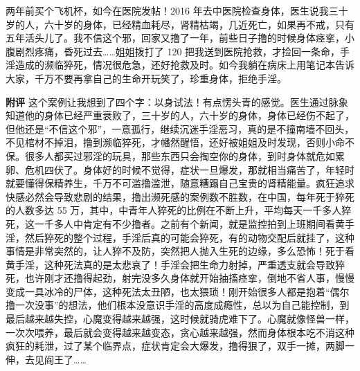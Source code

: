 \begin{case}
    两年前买个飞机杯，如今在医院发帖！2016 年去中医院检查身体，医生说我三十岁的人，六十岁的身体，已经精血耗尽，肾精枯竭，几近死亡，如果再不戒，只有五年活头儿了。我不信这个邪，回家又撸了一年，前些日子撸的时候身体痉挛，小腹剧烈疼痛，昏死过去……姐姐拨打了 120 把我送到医院抢救，才捡回一条命，手淫造成的濒临猝死，情况很危急，还好抢救及时。如今我躺在病床上用笔记本告诉大家，千万不要再拿自己的生命开玩笑了，珍重身体，拒绝手淫。

    \textbf{附评} 这个案例让我想到了四个字：以身试法！有点愣头青的感觉。医生通过脉象知道他的身体已经严重衰败了，三十岁的人，六十岁的身体，身体已经伤不起了，但他还是“不信这个邪”，一意孤行，继续沉迷手淫恶习，真的是不撞南墙不回头，不见棺材不掉泪，撸到濒临猝死，才幡然醒悟，还好被姐姐及时发现，否则小命不保。很多人都买过邪淫的玩具，那些东西只会掏空你的身体，到时身体就危如累卵、危机四伏了。身体好的时候不觉得，症状一旦爆发，那就相当痛苦了，年轻时就要懂得保精养生，千万不可滥撸滥泄，随意糟蹋自己宝贵的肾精能量。疯狂追求快感必然会导致悲剧的结果，撸出濒死感的案例数不胜数，在中国，每年死于猝死的人数多达 55 万，其中，中青年人猝死的比例在不断上升，平均每天一千多人猝死，这一千多人中肯定有不少撸者。之前有个新闻，就是监控拍到上班期间看黄手淫，然后猝死的整个过程，手淫后真的可能会猝死，有的动物交配后就挂了，这种事情是非常突然的，让人猝不及防，突然把人抛入生死的边缘，多么恐怖！死于看黄手淫，这种死法真的是太悲哀了！手淫会把生命力射掉，严重透支就会导致猝死，也许刚才还撸得起劲，射完没多久身体就开始抽搐痉挛，倒地不省人事，慢慢变成一具冰冷的尸体，这种死法太丑陋，也太猥琐！刚开始很多人都是抱着“偶尔撸一次没事”的想法，他们根本没意识手淫的高度成瘾性，总以为自己能控制，到最后越来越失控，心魔变得越来越强，这时候就骑虎难下了。心魔就像怪兽一样，一次次喂养，最后就会变得越来越变态，贪心越来越强，然而身体根本吃不消这种疯狂的耗泄，过了某个临界点，症状肯定会大爆发，撸得狠了，双手一摊，两脚一伸，去见阎王了……
\end{case}


